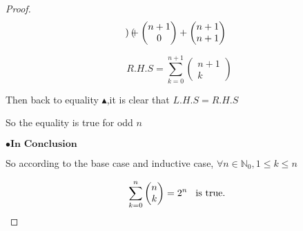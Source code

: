 \documentclass[12pt]{article}
\begin{document}
\begin{proof}
\[\begin{pmatrix}
             
              \end{pmatrix} + \begin{pmatrix}
                n+1 \\
                0
              \end{pmatrix} + \begin{pmatrix}
                n+1 \\
                n+1
              \end{pmatrix} \\ \]

    \[ R.H.S = \sum_{k=0}^{n+1} \begin{pmatrix}
                n+1 \\
                k
            \end{pmatrix} \]

    
    \vspace*{0.3cm}
    \hspace*{1.2cm}
    Then back to equality $\blacktriangle$,it is clear that $L.H.S = R.H.S$

    \vspace*{0.3cm}
    \hspace*{1.2cm}
    So the equality is true for odd $n$

    
    \vspace*{0.4cm}
    $\bullet \textbf{In Conclusion}$

    \vspace*{0.3cm}
    \hspace*{1.2cm}
    So according to the base case and inductive case, $\forall n \in \mathbb{N}_{0} , 1 \leq k \leq n$

    \[ \sum_{k=0}^{n} 
    \begin{pmatrix}
        n \\
        k
    \end{pmatrix} = 2^n \hspace*{0.3cm} \text{is true. }\]


    

        
    



    
              

    
    


              

\end{proof}
\end{document}

